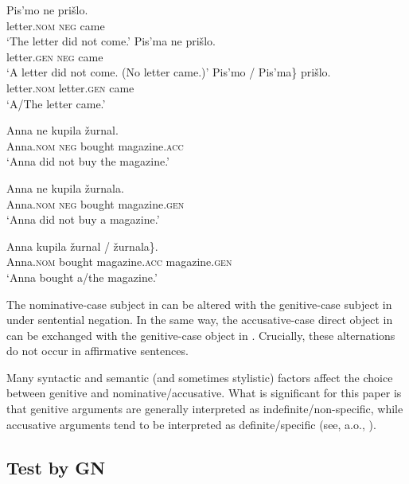 \documentclass[output=paper,
colorlinks,
citecolor=brown,
newtxmath
]{langscibook}
\begin{document}
\ea\label{GN-S}
\ea\label{GN-SN}
\gll	Pis'mo ne prišlo.\\
	letter.\textsc{nom} \textsc{neg} came\\
\glt	`The letter did not come.'
\ex\label{GN-SG}
\gll	Pis'ma ne prišlo.\\
	letter.\textsc{gen} \textsc{neg} came\\
\glt	`A letter did not come. (No letter came.)'
\hfill \citep[292]{Apresjan1985}
\ex\label{GN-Saf}
\gll	\minsp{\{} Pis'mo / \minsp{*} Pis'ma\} prišlo.\\
	{} letter.\textsc{nom} {} {} letter.\textsc{gen} came\\
\glt	`A/The letter came.'
\z\z

\ea\label{GN-O}
\ea\label{GN-OA}
\gll	Anna ne kupila žurnal.\\
	Anna.\textsc{nom} \textsc{neg} bought magazine.\textsc{acc}\\
\glt `Anna did not buy the magazine.'

\ex\label{GN-OG}
\gll	Anna ne kupila žurnala.\\
	Anna.\textsc{nom} \textsc{neg} bought magazine.\textsc{gen}\\
\glt	`Anna did not buy a magazine.'

\ex\label{GN-Oaf}
\gll	Anna kupila \minsp{\{} žurnal / \minsp{*} žurnala\}.\\
	Anna.\textsc{nom} bought {} magazine.\textsc{acc} {} {} magazine.\textsc{gen}\\
\glt	`Anna bought a/the magazine.'
\hfill \citep[647]{Harves2002}
\z\z

\noindent The nominative-case subject in  can be altered with the genitive-case subject in  under sentential negation. In the same way, the accusative-case direct object in  can be exchanged with the genitive-case object in . Crucially, these alternations do not occur in affirmative sentences.

Many syntactic and semantic (and sometimes stylistic) factors affect the choice between genitive and nominative/accusative. What is significant for this paper is that genitive arguments are generally interpreted as indefinite/non-specific, while accusative arguments tend to be interpreted as definite/specific (see, a.o., \citealt{Timberlake1975,Harves2002,Kim2003,Partee.Borschev2004,Kagan2012,Harves2013}).

\subsection{Test by GN}
\end{document}
